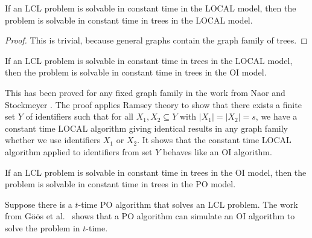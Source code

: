 \begin{observation} \label{obs:algorithm:from_pn_to_local:o1_local_gen_imply_o1_local_trees}
    If an LCL problem is solvable in constant time in the LOCAL model, then the problem is solvable in constant time in trees in the LOCAL model.
\end{observation}
\begin{proof}
    This is trivial, because general graphs contain the graph family of trees.
\end{proof}

\begin{lemma} \label{lem:algorithm:from_pn_to_local:o1_local_trees_imply_o1_oi_trees}
    If an LCL problem is solvable in constant time in trees in the LOCAL model, then the problem is solvable in constant time in trees in the OI model.
\end{lemma}
This has been proved for any fixed graph family in the work from Naor and Stockmeyer \cite[theorem 3.3]{DBLP:journals/siamcomp/NaorS95}.
The proof applies Ramsey theory to show that there exists a finite set $Y$ of identifiers such that for all $X_1, X_2 \subseteq Y$ with $|X_1| = |X_2| = s$, we have a constant time LOCAL algorithm giving identical results in any graph family whether we use identifiers $X_1$ or $X_2$.
It shows that the constant time LOCAL algorithm applied to identifiers from set $Y$ behaves like an OI algorithm.

\begin{lemma} \label{lem:algorithm:from_pn_to_local:o1_oi_trees_imply_o1_po_trees}
    If an LCL problem is solvable in constant time in trees in the OI model, then the problem is solvable in constant time in trees in the PO model.
\end{lemma}
Suppose there is a $t$-time PO algorithm that solves an LCL problem.
The work from Göös et al.~\cite{DBLP:journals/dc/GoosHS17} shows that a PO algorithm can simulate an OI algorithm to solve the problem in $t$-time.


